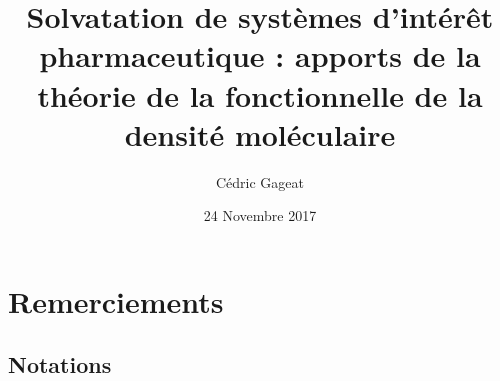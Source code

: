 \documentclass{bredele}
\title{Solvatation de systèmes d’intérêt pharmaceutique : apports de la théorie de la fonctionnelle de la densité moléculaire}
\author{Cédric Gageat}
\institute{l'\'Ecole Normale Supérieure}
\date{24 Novembre 2017}
\begin{document}
\tikzexternaldisable
\maketitle{}
\tikzexternalenable


\cleardoublepage
	
\frontmatter
\chapter*{Remerciements}


\clearemptydoublepage



\renewcommand\contentsname{Sommaire}
\tableofcontents
 
 
\renewcommand{\cftdotsep}{\cftnodots}
\cleardoublepage
\listoffigures
\cleardoublepage
\listoftables


\clearemptydoublepage
\section*{Notations}
\end{document}
